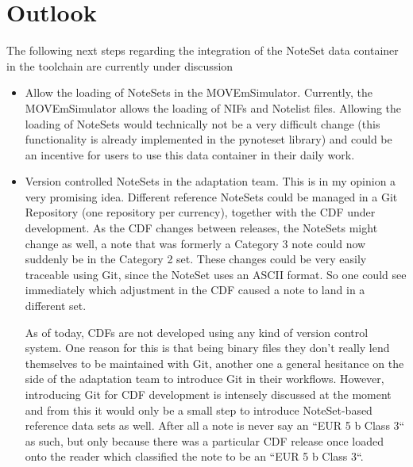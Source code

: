 \section{Outlook}
The following next steps regarding the integration of the NoteSet data container in the toolchain are currently under discussion
\begin{itemize}
	\item Allow the loading of NoteSets in the MOVEmSimulator. Currently, the MOVEmSimulator allows the loading of NIFs and Notelist files. Allowing the loading of NoteSets would technically not be a very difficult change (this functionality is already implemented in the pynoteset library) and could be an incentive for users to use this data container in their daily work.
	\item Version controlled NoteSets in the adaptation team. This is in my opinion a very promising idea. Different reference NoteSets could be managed in a Git Repository (one repository per currency), together with the CDF under development. As the CDF changes between releases, the NoteSets might change as well, a note that was formerly a Category 3 note could now suddenly be in the Category 2 set. These changes could be very easily traceable using Git, since the NoteSet uses an ASCII format. So one could see immediately which adjustment in the CDF caused a note to land in a different set.\par
	As of today, CDFs are not developed using any kind of version control system. One reason for this is that being binary files they don't really lend themselves to be maintained with Git, another one a general hesitance on the side of the adaptation team to introduce Git in their workflows. However, introducing Git for CDF development is intensely discussed at the moment and from this it would only be a small step to introduce NoteSet-based reference data sets as well. After all a note is never say an ``EUR 5 b Class 3`` as such, but only because there was a particular CDF release once loaded onto the reader which classified the note to be an ``EUR 5 b Class 3``.
\end{itemize}